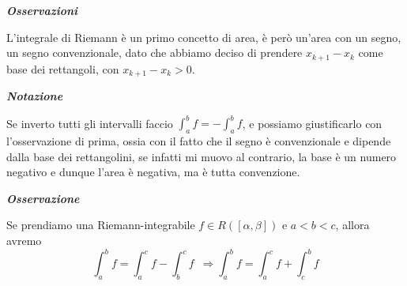 \documentclass{article}
\theoremstyle{definition}
\begin{document}
\begin{center}
    \textbf{\textit{Osservazioni}}
\end{center}
L'integrale di Riemann è un primo concetto di area, è però un'area con un segno, un segno convenzionale, dato che abbiamo deciso di prendere $x_{k+1}-x_k$ come base dei rettangoli, con $x_{k+1}-x_k > 0$.
\begin{center}
    \textbf{\textit{Notazione}}
\end{center}
Se inverto tutti gli intervalli faccio $\int_a^b f = -\int_a^b f$, e possiamo giustificarlo con l'osservazione di prima, ossia con il fatto che il segno è convenzionale e dipende dalla base dei rettangolini, se infatti mi muovo al contrario, la base è un numero negativo e dunque l'area è negativa, ma è tutta convenzione.
\\
\begin{center}
    \textbf{\textit{Osservazione}}
\end{center}
Se prendiamo una Riemann-integrabile $f \in R([\alpha,\beta])$ e $a < b < c$, allora avremo 
\begin{equation*}
    \int_a^b f = \int_a^c f- \int_b^c f \,\,\, \Longrightarrow \int_a^b f =\int_a^c f +\int_c^b f
\end{equation*}
\end{document}
